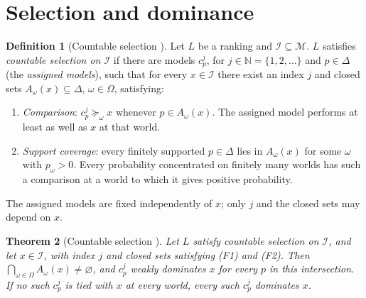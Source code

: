 \documentclass[11pt]{article}
\newtheorem{theorem}{Theorem}[section]
\theoremstyle{definition}
\newtheorem{definition}[theorem]{Definition}
\newcommand{\M}{\mathcal M}
\newcommand{\I}{\mathcal I}
\begin{document}
\section{Selection and dominance}\label{sec:selection}

{\color{red}
\begin{definition}[Countable selection {\cite{LDG}}]\label{def:selection}
Let $L$ be a ranking and $\I\subseteq\M$. $L$ satisfies \emph{countable selection on $\I$} if there are models $c^j_p$, for $j\in\mathbb N=\{1,2,\ldots\}$ and $p\in\Delta$ (the \emph{assigned models}), such that for every $x\in\I$ there exist an index $j$ and closed sets $A_\omega(x)\subseteq\Delta$, $\omega\in\Omega$, satisfying:
\begin{enumerate}[label=\textbf{(F\arabic*)},leftmargin=3.2em]
\item \emph{Comparison}: $c^j_p\succeq_\omega x$ whenever $p\in A_\omega(x)$. The assigned model performs at least as well as $x$ at that world.
\item \emph{Support coverage}: every finitely supported $p\in\Delta$ lies in $A_\omega(x)$ for some $\omega$ with $p_\omega>0$. Every probability concentrated on finitely many worlds has such a comparison at a world to which it gives positive probability.
\end{enumerate}
The assigned models are fixed independently of $x$; only $j$ and the closed sets may depend on $x$.
\end{definition}

\begin{theorem}[Countable selection {\cite{LDG}}]\label{thm:LDGgeneral} Let $L$ satisfy countable selection on $\I$, and let $x\in\I$, with index $j$ and closed sets satisfying (F1) and (F2). Then $\bigcap_{\omega\in\Omega}A_\omega(x)\ne\varnothing$, and $c^j_p$ weakly dominates $x$ for every $p$ in this intersection. If no such $c^j_p$ is tied with $x$ at every world, every such $c^j_p$ dominates $x$.
\end{theorem}
}
\end{document}
